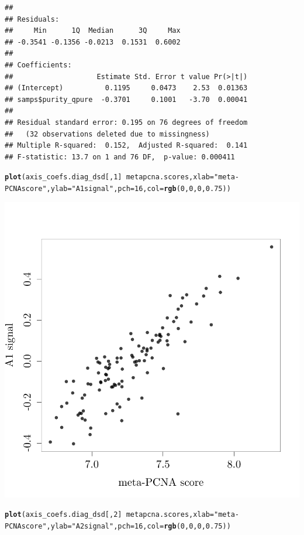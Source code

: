 \documentclass{article}\usepackage[]{graphicx}\usepackage[]{color}
\makeatletter
\def\maxwidth{ %
  \ifdim\Gin@nat@width>\linewidth
    \linewidth
  \else
    \Gin@nat@width
  \fi
}
\newcommand{\hlnum}[1]{\textcolor[rgb]{0.686,0.059,0.569}{#1}}%
\newcommand{\hlstr}[1]{\textcolor[rgb]{0.192,0.494,0.8}{#1}}%
\newcommand{\hlopt}[1]{\textcolor[rgb]{0,0,0}{#1}}%
\newcommand{\hlstd}[1]{\textcolor[rgb]{0.345,0.345,0.345}{#1}}%
\newcommand{\hlkwc}[1]{\textcolor[rgb]{0.333,0.667,0.333}{#1}}%
\newcommand{\hlkwd}[1]{\textcolor[rgb]{0.737,0.353,0.396}{\textbf{#1}}}%
\newenvironment{kframe}{%
 \def\at@end@of@kframe{}%
 \ifinner\ifhmode%
  \def\at@end@of@kframe{\end{minipage}}%
  \begin{minipage}{\columnwidth}%
 \fi\fi%
 \def\FrameCommand##1{\hskip\@totalleftmargin \hskip-\fboxsep
 \colorbox{shadecolor}{##1}\hskip-\fboxsep
     \hskip-\linewidth \hskip-\@totalleftmargin \hskip\columnwidth}%
 \MakeFramed {\advance\hsize-\width
   \@totalleftmargin\z@ \linewidth\hsize
   \@setminipage}}%
 {\par\unskip\endMakeFramed%
 \at@end@of@kframe}
\newenvironment{knitrout}{}{} %
\makeatother
\begin{document}
\begin{knitrout}
\begin{kframe}
\begin{verbatim}
## 
## Residuals:
##     Min      1Q  Median      3Q     Max 
## -0.3541 -0.1356 -0.0213  0.1531  0.6002 
## 
## Coefficients:
##                    Estimate Std. Error t value Pr(>|t|)
## (Intercept)          0.1195     0.0473    2.53  0.01363
## samps$purity_qpure  -0.3701     0.1001   -3.70  0.00041
## 
## Residual standard error: 0.195 on 76 degrees of freedom
##   (32 observations deleted due to missingness)
## Multiple R-squared:  0.152,	Adjusted R-squared:  0.141 
## F-statistic: 13.7 on 1 and 76 DF,  p-value: 0.000411
\end{verbatim}
\begin{alltt}
\hlkwd{plot}\hlstd{(axis_coefs.diag_dsd[,}\hlnum{1}\hlstd{]} \hlopt{~} \hlstd{metapcna.scores,} \hlkwc{xlab} \hlstd{=} \hlstr{"meta-PCNA score"}\hlstd{,} \hlkwc{ylab} \hlstd{=} \hlstr{"A1 signal"}\hlstd{,} \hlkwc{pch} \hlstd{=} \hlnum{16}\hlstd{,} \hlkwc{col} \hlstd{=} \hlkwd{rgb}\hlstd{(}\hlnum{0}\hlstd{,} \hlnum{0}\hlstd{,} \hlnum{0}\hlstd{,} \hlnum{0.75}\hlstd{))}
\end{alltt}
\end{kframe}

{\centering \includegraphics[width=\maxwidth]{figure/nmf-msigdb-cor-plots-5} 

}


\begin{kframe}\begin{alltt}
\hlkwd{plot}\hlstd{(axis_coefs.diag_dsd[,}\hlnum{2}\hlstd{]} \hlopt{~} \hlstd{metapcna.scores,} \hlkwc{xlab} \hlstd{=} \hlstr{"meta-PCNA score"}\hlstd{,} \hlkwc{ylab} \hlstd{=} \hlstr{"A2 signal"}\hlstd{,} \hlkwc{pch} \hlstd{=} \hlnum{16}\hlstd{,} \hlkwc{col} \hlstd{=} \hlkwd{rgb}\hlstd{(}\hlnum{0}\hlstd{,} \hlnum{0}\hlstd{,} \hlnum{0}\hlstd{,} \hlnum{0.75}\hlstd{))}
\end{alltt}
\end{kframe}


\end{knitrout}
\end{document}
